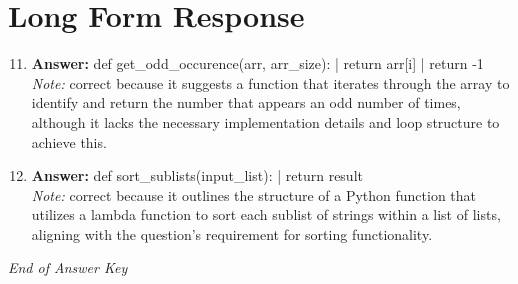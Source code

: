 \documentclass[12pt]{article}
\begin{document}
\section*{Long Form Response}
\begin{enumerate}[label=\arabic*.]
\setcounter{enumi}{10}
\item \textbf{Answer:} def get\_odd\_occurence(arr, arr\_size): | return arr[i] | return -1
\\ \textit{Note:} correct because it suggests a function that iterates through the array to identify and return the number that appears an odd number of times, although it lacks the necessary implementation details and loop structure to achieve this.
\item \textbf{Answer:} def sort\_sublists(input\_list): | return result
\\ \textit{Note:} correct because it outlines the structure of a Python function that utilizes a lambda function to sort each sublist of strings within a list of lists, aligning with the question's requirement for sorting functionality.
\end{enumerate}

\vfill
\noindent\textit{End of Answer Key}
\end{document}
